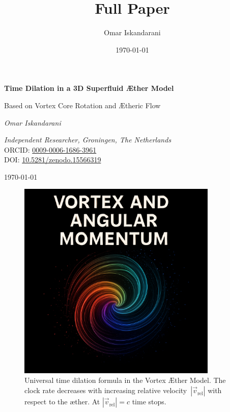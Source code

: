 \documentclass[a4paper,12pt]{article}
\title{Full Paper}
\author{Omar Iskandarani}
\date{\today}
\begin{document}
\begin{titlepage}
    \thispagestyle{empty}
    \centering
    \vspace*{2cm}
    {\Huge\bfseries Time Dilation in a 3D Superfluid Æther Model \par}
    \vspace{0.5cm}
    {\Large Based on Vortex Core Rotation and Ætheric Flow \par}
    \vspace{0.5cm}
    {\Large\itshape Omar Iskandarani\par}
    \vspace{0.5cm}
    \textit{Independent Researcher, Groningen, The Netherlands} \\
    ORCID: \href{https://orcid.org/0009-0006-1686-3961}{0009-0006-1686-3961} \\
    DOI: \href{https://doi.org/10.5281/zenodo.15566319}{10.5281/zenodo.15566319} \\
    {\large \today\par}


    \begin{figure}[ht]
        \centering
        \includegraphics[width=0.85\textwidth]{images/image_vortex}
        \caption{Universal time dilation formula in the Vortex Æther Model. The clock rate decreases with increasing relative velocity~$|\vec{v}_{\mathrm{rel}}|$ with respect to the æther. At $|\vec{v}_{\mathrm{rel}}| = c$ time stops.}
        \label{fig:TijdsvertragingRelatieveBeweging}
    \end{figure}

\end{titlepage}

    \tableofcontents



    \appendix
    \def\standalonechapter{false}
    
    
    

    
    
\end{document}
